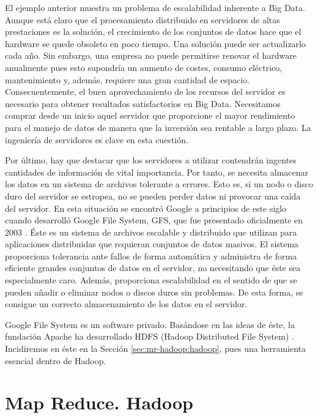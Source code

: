 \documentclass[10pt]{article}
\begin{document}
		El ejemplo anterior muestra un problema de escalabilidad inherente a Big Data. Aunque está claro que el procesamiento distribuido en servidores de altas prestaciones es la solución, el crecimiento de los conjuntos de datos hace que el hardware se quede obsoleto en poco tiempo. Una solución puede ser actualizarlo cada año. Sin embargo, una empresa no puede permitirse renovar el hardware anualmente pues esto supondría un aumento de costes, consumo eléctrico, mantenimiento y, además, requiere una gran cantidad de espacio. Consecuentemente, el buen aprovechamiento de los recursos del servidor es necesario para obtener resultados satisfactorios en Big Data. Necesitamos comprar desde un inicio aquel servidor que proporcione el mayor rendimiento para el manejo de datos de manera que la inversión sea rentable a largo plazo. La ingeniería de servidores es clave en esta cuestión.
		
		Por último, hay que destacar que los servidores a utilizar contendrán ingentes cantidades de información de vital importancia. Por tanto, se necesita almacenar los datos en un sistema de archivos tolerante a errores. Esto es, si un nodo o disco duro del servidor se estropea, no se pueden perder datos ni provocar una caída del servidor. En esta situación se encontró Google a principios de este siglo cuando desarrolló Google File System, GFS, que fue presentado oficialmente en 2003 \cite{gfs}. Éste es un sistema de archivos escalable y distribuido que utilizan para aplicaciones distribuidas que requieran conjuntos de datos masivos. El sistema proporciona tolerancia ante fallos de forma automática y administra de forma eficiente grandes conjuntos de datos en el servidor, no necesitando que éste sea especialmente caro. Además, proporciona escalabilidad en el sentido de que se pueden añadir o eliminar nodos o discos duros sin problemas. De esta forma, se consigue un correcto almacenamiento de los datos en el servidor.
				
		Google File System es un software privado. Basándose en las ideas de éste, la fundación Apache ha desarrollado HDFS (Hadoop Distributed File System) \cite{hdfs}. Incidiremos en éste en la Sección \ref{sec:mr-hadoop:hadoop}, pues una herramienta esencial dentro de Hadoop.
				
	

\section{Map Reduce. Hadoop} \label{sec:mr-hadoop}
\end{document}
